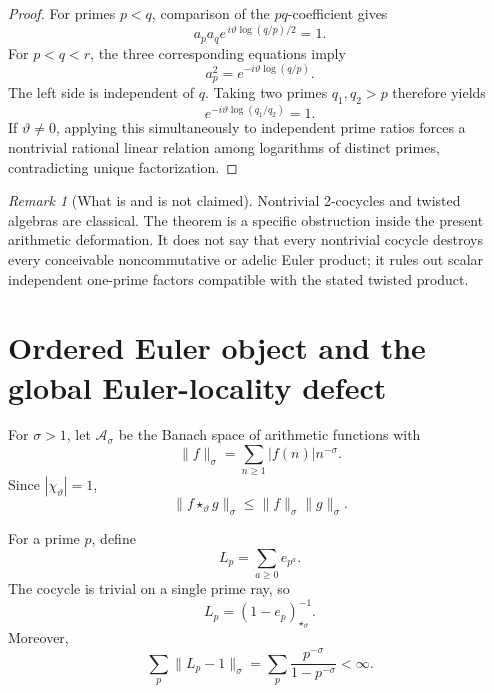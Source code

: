 \documentclass[11pt]{amsart}
\numberwithin{equation}{section}
\theoremstyle{plain}
\theoremstyle{definition}
\theoremstyle{remark}
\newtheorem{remark}[theorem]{Remark}
\begin{document}
\begin{proof}
For primes \(p<q\), comparison of the \(pq\)-coefficient gives
\begin{equation}
a_pa_q
e^{\,i\vartheta\log(q/p)/2}=1.
\label{eq:ap_aq_consistency}
\end{equation}
For \(p<q<r\), the three corresponding equations imply
\begin{equation}
a_p^2=e^{-i\vartheta\log(q/p)}.
\label{eq:ap_square_resonance}
\end{equation}
The left side is independent of \(q\).  Taking two primes \(q_1,q_2>p\)
therefore yields
\begin{equation}
e^{-i\vartheta\log(q_1/q_2)}=1.
\label{eq:universal_prime_resonance}
\end{equation}
If \(\vartheta\ne0\), applying this simultaneously to independent prime
ratios forces a nontrivial rational linear relation among logarithms of
distinct primes, contradicting unique factorization.
\end{proof}

\begin{remark}[What is and is not claimed]
\label{rem:euler_obstruction_scope}
Nontrivial 2-cocycles and twisted algebras are classical.  The theorem is a
specific obstruction inside the present arithmetic deformation.  It does not
say that every nontrivial cocycle destroys every conceivable noncommutative
or adelic Euler product; it rules out scalar independent one-prime factors
compatible with the stated twisted product.
\end{remark}

\section{Ordered Euler object and the global Euler-locality defect}
\label{sec:ordered_euler_defect}

For \(\sigma>1\), let \(\mathcal A_\sigma\) be the Banach space of arithmetic
functions with
\begin{equation}
\|f\|_\sigma=\sum_{n\ge1}|f(n)|n^{-\sigma}.
\label{eq:Asigma_norm}
\end{equation}
Since \(|\chi_\vartheta|=1\),
\begin{equation}
\|f\star_\vartheta g\|_\sigma
\le \|f\|_\sigma\|g\|_\sigma.
\label{eq:twisted_Banach_submultiplicative}
\end{equation}

For a prime \(p\), define
\begin{equation}
L_p=\sum_{a\ge0}e_{p^a}.
\label{eq:local_ray_factor}
\end{equation}
The cocycle is trivial on a single prime ray, so
\begin{equation}
\boxed{L_p=(1-e_p)_{\star_\vartheta}^{-1}.}
\label{eq:local_ray_inverse}
\end{equation}
Moreover,
\begin{equation}
\sum_p\|L_p-1\|_\sigma
=
\sum_p\frac{p^{-\sigma}}{1-p^{-\sigma}}<\infty.
\label{eq:ordered_euler_norm_sum}
\end{equation}
\end{document}
